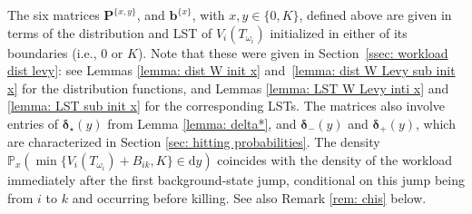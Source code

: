 \documentclass[reqno,12pt]{amsart}
\newcommand{\bs}{\boldsymbol}
\begin{document}
\fi
{The six matrices $\bs{P}^{\{x,y\}}$, and ${\bs b}^{\{x\}}$, with $x,y\in\{0,K\}$, defined above are given in terms of the distribution and LST of $V_i(T_{\omega_i})$ initialized in either of its boundaries (i.e., $0$ or $K$). Note that these were given in Section~\ref{ssec: workload dist levy}: see Lemmas \ref{lemma: dist W init x} and~\ref{lemma: dist W Levy sub init x} for the distribution functions, and Lemmas \ref{lemma: LST W Levy inti x} and \ref{lemma: LST sub init x} for the corresponding LSTs.} 
The matrices  also involve entries of ${\bs \delta}_\star(y)$ from Lemma \ref{lemma: delta*}, and ${\bs \delta}_-(y)$ and ${\bs \delta}_+(y)$, which are characterized in Section \ref{sec: hitting probabilities}. The density $\mathbb{P}_x\left(\min\{V_i(T_{\omega_i}) + B_{ik}, K\}\in\mathrm{d}y\right)$ coincides with the density of the workload immediately after the first background-state jump, conditional on this jump being from $i$ to $k$ and occurring before killing. See also Remark \ref{rem: chis} below. 
\end{document}

